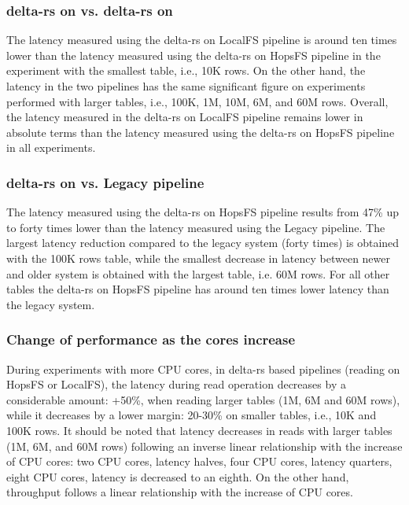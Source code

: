 \subsubsection*{delta-rs on  vs. delta-rs on }

The latency measured using the delta-rs on \gls{LocalFS} pipeline is around ten times lower than the latency measured using the delta-rs on \gls{HopsFS} pipeline in the experiment with the smallest table, i.e., 10K rows. On the other hand, the latency in the two pipelines has the same significant figure on experiments performed with larger tables, i.e., 100K, 1M, 10M, 6M, and 60M rows. Overall, the latency measured in the delta-rs on \gls{LocalFS} pipeline remains lower in absolute terms than the latency measured using the delta-rs on \gls{HopsFS} pipeline in all experiments.

\subsubsection*{delta-rs on  vs. Legacy pipeline}

The latency measured using the delta-rs on \gls{HopsFS} pipeline results from 47\% up to forty times lower than the latency measured using the Legacy pipeline. The largest latency reduction compared to the legacy system (forty times) is obtained with the 100K rows table, while the smallest decrease in latency between newer and older system is obtained with the largest table, i.e. 60M rows. For all other tables the delta-rs on \gls{HopsFS} pipeline has around ten times lower latency than the legacy system.

\subsubsection*{Change of performance as the  cores increase}

During experiments with more \gls{CPU} cores, in delta-rs based pipelines (reading on \gls{HopsFS} or \gls{LocalFS}), the latency during read operation decreases by a considerable amount: +50\%, when reading larger tables (1M, 6M and 60M rows), while it decreases by a lower margin: 20-30\% on smaller tables, i.e., 10K and 100K rows. It should be noted that latency decreases in reads with larger tables (1M, 6M, and 60M rows) following an inverse linear relationship with the increase of \gls{CPU} cores: two \gls{CPU} cores, latency halves, four \gls{CPU} cores, latency quarters, eight \gls{CPU} cores, latency is decreased to an eighth. On the other hand, throughput follows a linear relationship with the increase of \gls{CPU} cores.

